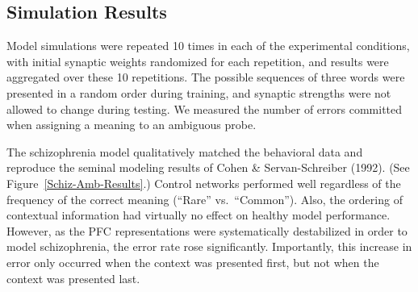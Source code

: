 \subsection{Simulation Results}

Model simulations were repeated 10 times in each of the experimental conditions, with initial synaptic weights randomized for each repetition, and results were aggregated over these 10 repetitions. The possible sequences of three words were presented in a random order during training, and synaptic strengths were not allowed to change during testing. We measured the number of errors committed when assigning a meaning to an ambiguous probe.

The schizophrenia model qualitatively matched the behavioral data and reproduce the seminal modeling results of Cohen \& Servan-Schreiber (1992). (See Figure~\ref{Schiz-Amb-Results}.) Control networks performed well regardless of the frequency of the correct meaning (``Rare'' vs.\ ``Common''). Also, the ordering of contextual information had virtually no effect on healthy model performance. However, as the PFC representations were systematically destabilized in order to model schizophrenia, the error rate rose significantly. Importantly, this increase in error only occurred when the context was presented first, but not when the context was presented last. 
